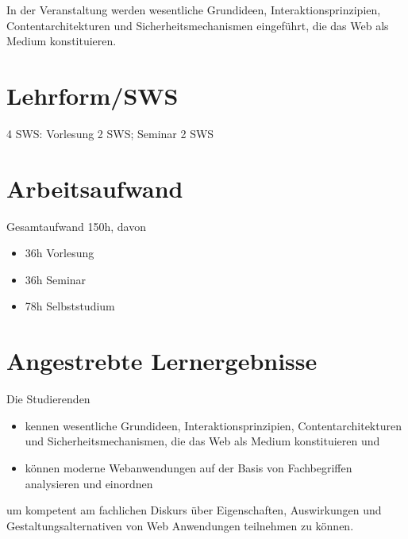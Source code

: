In der Veranstaltung werden wesentliche Grundideen,
Interaktionsprinzipien, Contentarchitekturen und Sicherheitsmechanismen
eingeführt, die das Web als Medium konstituieren.

\section*{Lehrform/SWS\label{/mi-2017/modulbeschreibungen-bachelor/BA_Grundlagen_des_Web}}\label{lehrformswspathlabelmi-2017modulbeschreibungen-bachelorbaux5fgrundlagenux5fdesux5fweb}

4 SWS: Vorlesung 2 SWS; Seminar 2 SWS

\section*{Arbeitsaufwand\label{/mi-2017/modulbeschreibungen-bachelor/BA_Grundlagen_des_Web}}\label{arbeitsaufwandpathlabelmi-2017modulbeschreibungen-bachelorbaux5fgrundlagenux5fdesux5fweb}

Gesamtaufwand 150h, davon

\begin{itemize}
\tightlist
\item
  36h Vorlesung
\item
  36h Seminar
\item
  78h Selbststudium
\end{itemize}

\section*{Angestrebte
Lernergebnisse\label{/mi-2017/modulbeschreibungen-bachelor/BA_Grundlagen_des_Web}}\label{angestrebte-lernergebnissepathlabelmi-2017modulbeschreibungen-bachelorbaux5fgrundlagenux5fdesux5fweb}

Die Studierenden

\begin{itemize}
\tightlist
\item
  kennen wesentliche Grundideen, Interaktionsprinzipien,
  Contentarchitekturen und Sicherheitsmechanismen, die das Web als
  Medium konstituieren und
\item
  können moderne Webanwendungen auf der Basis von Fachbegriffen
  analysieren und einordnen
\end{itemize}

um kompetent am fachlichen Diskurs über Eigenschaften, Auswirkungen und
Gestaltungsalternativen von Web Anwendungen teilnehmen zu können.

